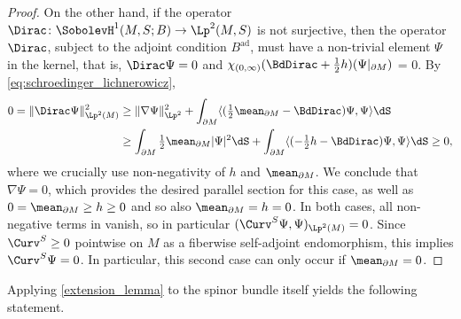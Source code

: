\documentclass[a4paper,11pt]{amsart}
\numberwithin{equation}{section}
\begin{document}
\begin{proof}
 On the other hand, if the operator \(\Dirac \colon \SobolevH^1(M,S; B) \to \Lp^2(M,S)\) is not surjective, then the operator \(\Dirac\), subject to the adjoint condition \(B^{\mathrm{ad}}\), must have a non-trivial element \(\Psi\) in the kernel, that is, \(\Dirac \Psi = 0\) and \(\chi_{(0,\infty)}(\BdDirac + \frac{1}{2} h)(\Psi|_{\partial M})\) = 0.
  By \eqref{eq:schroedinger_lichnerowicz},
  \begin{align*}
    0 = \|\Dirac \Psi\|_{\Lp^2(M)}^2 &\geq \| \nabla \Psi \|_{\Lp^2}^2 + \int_{\partial M} \langle (\tfrac{1}{2} \mean_{\partial M} - \BdDirac) \Psi, \Psi \rangle \dS \\
    &\geq \int_{\partial M} \tfrac{1}{2} \mean_{\partial M}  |\Psi|^2 \dS 
    + \int_{\partial M} \langle (-\tfrac{1}{2} h - \BdDirac) \Psi, \Psi \rangle \dS \geq 0,
  \end{align*}
  where we crucially use non-negativity of \(h\) and \(\mean_{\partial M}\).
  We conclude that \(\nabla \Psi = 0\), which provides the desired parallel section for this case, as well as \(0 = \mean_{\partial M} \geq h \geq 0\) and so also \(\mean_{\partial M} = h = 0\).
  In both cases, all non-negative terms in  vanish, so in particular \((\Curv^S \Psi,\Psi)_{\Lp^2(M)} = 0\).
  Since \(\Curv^S \geq 0\) pointwise on \(M\) as a fiberwise self-adjoint endomorphism, this implies \(\Curv^S \Psi = 0\).
  In particular, this second case can only occur if \(\mean_{\partial M} = 0\).
\end{proof}

Applying \cref{extension_lemma} to the spinor bundle itself yields the following statement.
\end{document}
